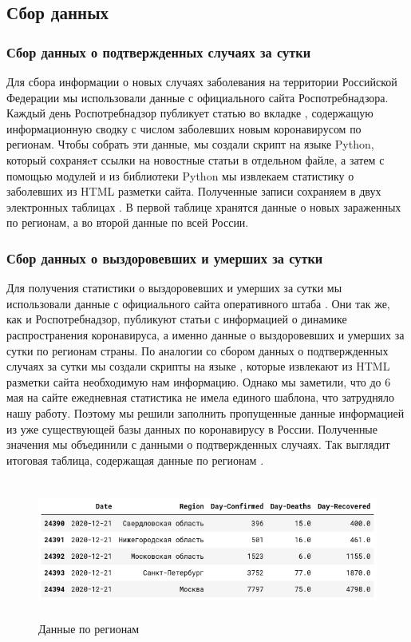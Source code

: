 \documentclass[a4paper, 12pt]{extarticle}
\begin{document}
\subsection{Сбор данных}
\subsubsection{Сбор данных о подтвержденных случаях за сутки}

Для сбора информации о новых случаях заболевания на территории Российской
Федерации мы использовали данные с официального сайта Роспотребнадзора. Каждый
день Роспотребнадзор публикует статью во вкладке ,
содержащую информационную сводку с числом заболевших новым коронавирусом по
регионам. Чтобы собрать эти данные, мы создали скрипт на языке Python, который
сохраняeт ссылки на новостные статьи в отдельном файле, а затем с помощью
модулей  и  из библиотеки Python
мы извлекаем статистику о заболевших из HTML разметки сайта. Полученные записи
сохраняем в двух электронных таблицах . В первой таблице
хранятся данные о новых зараженных по регионам, а во второй данные по всей
России.

\subsubsection{Сбор данных о выздоровевших и умерших за сутки}
Для получения статистики о выздоровевших и умерших за сутки мы использовали
данные с официального сайта оперативного штаба .
Они так же, как и Роспотребнадзор, публикуют статьи с информацией о динамике
распространения коронавируса, а именно данные о выздоровевших и умерших за
сутки по регионам страны. По аналогии со сбором данных о подтвержденных случаях
за сутки мы создали скрипты на языке , которые извлекают из
HTML разметки сайта необходимую нам информацию. Однако мы заметили, что до 6
мая на сайте  ежедневная статистика не имела
единого шаблона, что затрудняло нашу работу. Поэтому мы решили заполнить
пропущенные данные информацией из уже существующей базы данных по коронавирусу
в России. Полученные значения мы объединили с данными о подтвержденных случаях.
Так выглядит итоговая таблица, содержащая данные по регионам
.

\begin{figure}[h]
    \centering
    \includegraphics[height=130pt]{../plots/regions_df2.png}
    \caption{Данные по регионам} \label{fig:collection2_res}
\end{figure}
\end{document}
